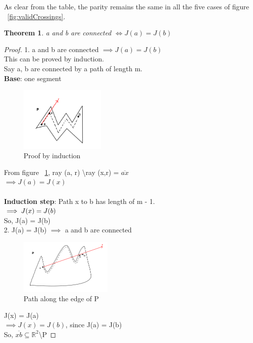 \documentclass{article}
\newcounter{lecnum}
\newtheorem{theorem}{Theorem}[lecnum]
\begin{document}
As clear from the table, the parity remains the same in all the five cases of figure ~\ref{fig:validCrossings}. 

\begin{theorem}
a and b are connected $\iff J(a) = J(b)$
\end{theorem}
\begin{proof}
1. a and b are connected $\implies J(a) = J(b)$\\
This can be proved by induction.\\
Say a, b are connected by a path of length m.\\
\textbf{Base}: one segment
\begin{figure}[h]
    \centering
    \includegraphics[width=0.37\textwidth]{images/jctProof1.png}
    \caption{Proof by induction}
    \label{fig:jctProof1}
\end{figure}
From figure ~\ref{fig:jctProof1}, ray (a, r) \textbackslash ray (x,r) = $\overline{ax}$\\
$\implies J(a) = J(x)$\\
\\\textbf{Induction step}: Path x to b has length of m - 1.\\
$\implies J(x) = J(b)\\$
\\So, J(a) = J(b)\\ 

2. J(a) = J(b) $\implies $ a and b are connected \\

\begin{figure}[h]
    \centering
    \includegraphics[width=0.4\textwidth]{images/jctProof2.png}
    \caption{Path along the edge of P}
    \label{fig:jctProof2}
\end{figure}

J(x) = J(a) \\
$\implies J(x) = J(b)$, since J(a) = J(b)\\
So, $\overline{xb} \subseteq \mathbb{R}^2$\textbackslash P
\end{proof}
\end{document}
